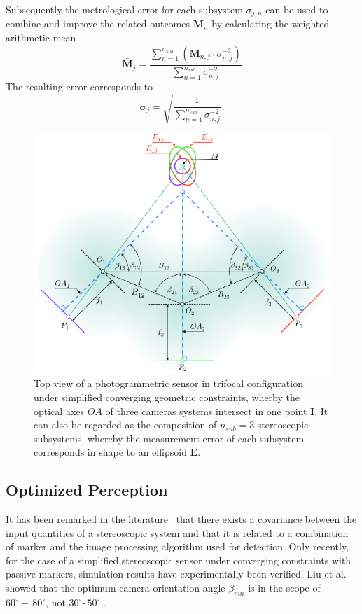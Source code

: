 \documentclass[5p,times,procedia]{elsarticle}
\begin{document}
Subsequently the metrological error for each subsystem $\sigma_{j,n}$ can be used to combine and improve the related outcomes $\mathbf{M}_n$ by calculating the weighted arithmetic mean \cite{Price1972}
\begin{equation}
	\mathbf{\bar{M}}_{j} = \frac{\sum_{n=1}^{n_{sub}} \left( \mathbf{M}_{n,j} \cdot \sigma_{n,j}^{-2} \right)}{\sum_{n=1}^{n_{sub}} \sigma_{n,j}^{-2}}
\end{equation}
The resulting error corresponds to
\begin{equation}
	\mathbf{\bar{\sigma}}_{j} = \sqrt{ \frac{1}{\sum_{n=1}^{n_{sub}} \sigma_{n,j}^{-2}} }.
\end{equation}

\begin{figure}[bth]
	\centering
	\includegraphics[width=0.8\linewidth]{graphics/MixedErrorCuttingGeometry.eps}
	\caption{Top view of a photogrammetric sensor in trifocal configuration under simplified converging geometric constraints, wherby the optical axes $OA$ of three cameras systems intersect in one point $\mathbf{I}$.		
	It can also be regarded as the composition of $n_{sub}=3$ stereoscopic subsystems, whereby the measurement error of each subsystem corresponds in shape to an ellipsoid $\mathbf{E}$.}
	\label{fig:sub_sensors}
\end{figure}

\subsection{Optimized Perception}
It has been remarked in the literature~\cite{Di_Leo_2011} that there exists a covariance between the input quantities of a stereoscopic system and that it is related to a combination of marker and the image processing algorithm used for detection.
Only recently, for the case of a simplified stereoscopic sensor under converging constraints with passive markers, simulation results have experimentally been verified.
Liu et al.~\cite{Liu_2021} showed that the optimum camera orientation angle $\beta_{mn}$ is in the scope of $60^{\circ} -\, 80^{\circ}$, not $30^{\circ} \text{-}\, 50^{\circ}$ \cite{Yang2018,Fooladgar2013,Sankowski2017}.
\end{document}
